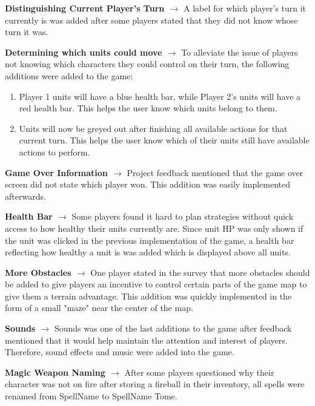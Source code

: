 \documentclass{article}
\begin{document}
\begin{description}[leftmargin=0.2cm]
\item \textbf{Distinguishing Current Player's Turn $\rightarrow$} A label for which player's turn it currently is was added after some players stated that they did not know whose turn it was.
\item \textbf{Determining which units could move $\rightarrow$} To alleviate the issue of players not knowing which characters they could control on their turn, the following additions were added to the game:
\begin{enumerate}
        \item Player 1 units will have a blue health bar, while Player 2's units will have a red health bar. This helps the user know which units belong to them.
        \item Units will now be greyed out after finishing all available actions for that current turn. This helps the user know which of their units still have available actions to perform.
    \end{enumerate}
\item \textbf{Game Over Information $\rightarrow$} Project feedback mentioned that the game over screen did not state which player won. This addition was easily implemented afterwards.
\item \textbf{Health Bar $\rightarrow$} Some players found it hard to plan strategies without quick access to how healthy their units currently are. Since unit HP was only shown if the unit was clicked in the previous implementation of the game, a health bar reflecting how healthy a unit is was added which is displayed above all units.
\item \textbf{More Obstacles $\rightarrow$} One player stated in the survey that more obstacles should be added to give players an incentive to control certain parts of the game map to give them a terrain advantage. This addition was quickly implemented in the form of a small "maze" near the center of the map.
\item \textbf{Sounds $\rightarrow$} Sounds was one of the last additions to the game after feedback mentioned that it would help maintain the attention and interest of players. Therefore, sound effects and music were added into the game.
\item \textbf{Magic Weapon Naming $\rightarrow$} After some players questioned why their character was not on fire after storing a fireball in their inventory, all spells were renamed from SpellName to SpellName Tome.

\end{description}
\end{document}
